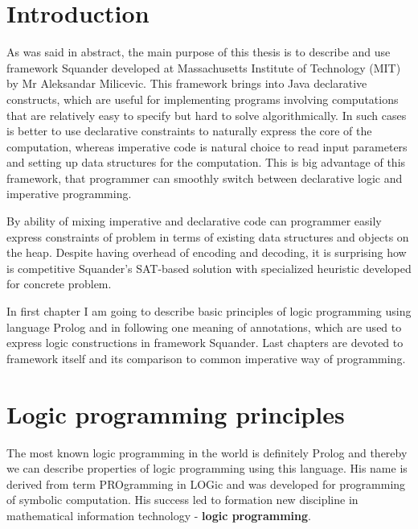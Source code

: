 \documentclass[11pt,twoside,a4paper]{book}
\begin{document}


% 
% 

\chapter{Introduction}
As was said in abstract, the main purpose of this thesis is to describe and use
framework Squander developed at Massachusetts Institute of Technology (MIT) by Mr
Aleksandar Milicevic. This framework brings into Java declarative
constructs, which are useful for implementing programs involving computations
that are relatively easy to specify but hard to solve algorithmically. In such
cases is better to use declarative constraints to naturally express the core of
the computation, whereas imperative code is natural choice to read input
parameters and setting up data structures for the computation. This is
big advantage of this framework, that programmer can smoothly switch between
declarative logic and imperative programming.

By ability of mixing imperative and declarative code can programmer easily
express constraints of problem in terms of existing data structures and objects
on the heap. Despite having overhead of encoding and decoding, it is surprising
how is competitive Squander's SAT-based solution with specialized heuristic
developed for concrete problem.

In first chapter I am going to describe basic principles of logic programming
using language Prolog and in following one meaning of annotations, which are
used to express logic constructions in framework Squander. Last chapters are
devoted to framework itself and its comparison to common imperative way of
programming.
\chapter{Logic programming principles}
\label{chap:logProgPrinc}
The most known logic programming in the world is definitely Prolog and
thereby we can describe properties of logic programming using this language.
His name is derived from term PROgramming in LOGic and was developed for
programming of symbolic computation. His success led to formation new discipline
in mathematical information technology - \textbf{logic programming}.
\end{document}
